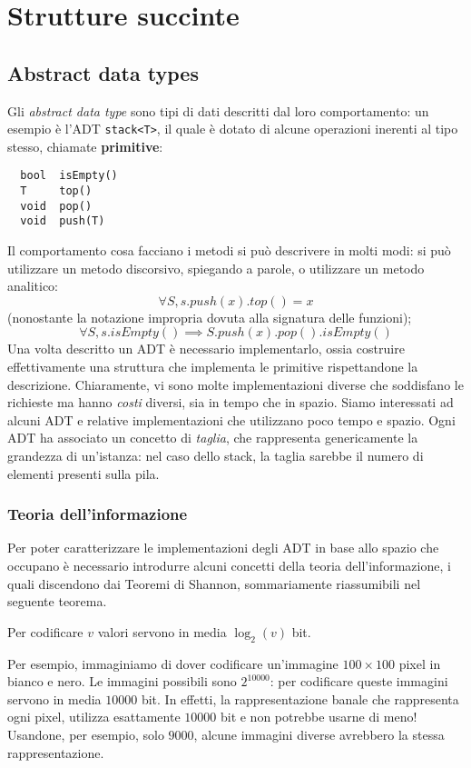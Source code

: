 \chapter{Strutture succinte}
\section{Abstract data types}
Gli \textit{abstract data type} sono tipi di dati descritti dal loro comportamento: un esempio è
l'ADT \texttt{stack<T>}, il quale è dotato di alcune operazioni inerenti al tipo
stesso, chiamate \textbf{primitive}:
\begin{lstlisting}
  bool  isEmpty()
  T     top()
  void  pop()
  void  push(T)
\end{lstlisting}
Il comportamento cosa facciano i metodi si può descrivere in molti modi: si può
utilizzare un metodo discorsivo, spiegando a parole, o utilizzare un metodo
analitico:
$$
	\forall S, s.push(x).top() = x
$$
(nonostante la notazione impropria dovuta alla signatura delle funzioni);
$$
	\forall S, s.isEmpty() \implies S.push(x).pop().isEmpty()
$$
Una volta descritto un ADT è necessario implementarlo, ossia costruire effettivamente
una struttura che implementa le primitive rispettandone la descrizione. Chiaramente,
vi sono molte implementazioni diverse che soddisfano le richieste
ma hanno \textit{costi} diversi, sia in tempo che in spazio. Siamo interessati
ad alcuni ADT e relative implementazioni che utilizzano poco tempo e spazio.
Ogni ADT ha associato un concetto di \textit{taglia}, che rappresenta genericamente
la grandezza di un'istanza: nel caso dello stack, la taglia sarebbe il numero
di elementi presenti sulla pila.

\subsection{Teoria dell'informazione}
Per poter caratterizzare le implementazioni degli ADT in base allo
spazio che occupano è necessario introdurre alcuni concetti della teoria
dell'informazione, i quali discendono dai Teoremi di Shannon,
sommariamente riassumibili nel seguente teorema.

\begin{theorem}
	\label{thm:shannon}
	Per codificare $v$ valori servono in media $\log_2(v)$ bit.
\end{theorem}

Per esempio, immaginiamo di dover codificare un'immagine $100\times100$ pixel
in bianco e nero. Le immagini possibili sono $2^{10000}$: per codificare
queste immagini servono in media $10000$ bit. In effetti, la
rappresentazione banale che rappresenta ogni pixel, utilizza esattamente
$10000$ bit e non potrebbe usarne di meno! Usandone, per esempio, solo
$9000$, alcune immagini diverse avrebbero la stessa rappresentazione.

